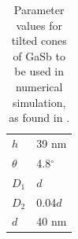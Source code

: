\begin{table}[h]
\centering
\caption{Parameter values for tilted cones of GaSb to be used in numerical simulation, as found in \cite{gasbcones}.}
\label{tab:gasbparameters}
\begin{tabular}{l l}
    \hline 
    $h$         &   39 nm    \\
    $\theta$    &   4.8$^\circ$   \\
    $D_1$       &   $d$    \\
    $D_2$       &   0.04$d$    \\
    $d$         &   40 nm   \\
    \hline
\end{tabular}
\end{table}

\clearpage